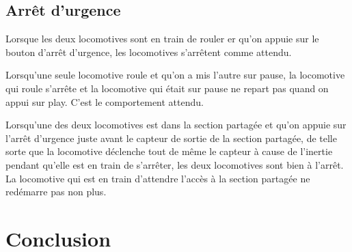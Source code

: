 \documentclass{article}
\begin{document}
\subsection*{Arrêt d'urgence}
Lorsque les deux locomotives sont en train de rouler er qu'on appuie sur le bouton d'arrêt d'urgence, les locomotives s'arrêtent comme attendu.

Lorsqu'une seule locomotive roule et qu'on a mis l'autre sur pause, la locomotive qui roule s'arrête et la locomotive qui était sur pause ne
repart pas quand on appui sur play. C'est le comportement attendu.

Lorsqu'une des deux locomotives est dans la section partagée et qu'on appuie sur l'arrêt d'urgence juste avant le capteur de sortie de la
section partagée, de telle sorte que la locomotive déclenche tout de même le capteur à cause de l'inertie pendant qu'elle est en train de
s'arrêter, les deux locomotives sont bien à l'arrêt. La locomotive qui est en train d'attendre l'accès à la section partagée ne redémarre
pas non plus. 

\section*{Conclusion}
\end{document}
